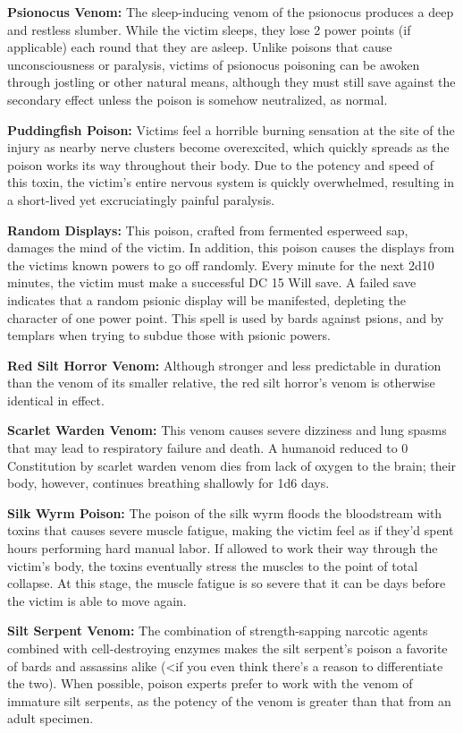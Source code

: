 \textbf{Psionocus Venom:} The sleep-inducing venom of the psionocus produces a deep and restless slumber. While the victim sleeps, they lose 2 power points (if applicable) each round that they are asleep. Unlike poisons that cause unconsciousness or paralysis, victims of psionocus poisoning can be awoken through jostling or other natural means, although they must still save against the secondary effect unless the poison is somehow neutralized, as normal.

\textbf{Puddingfish Poison:} Victims feel a horrible burning sensation at the site of the injury as nearby nerve clusters become overexcited, which quickly spreads as the poison works its way throughout their body. Due to the potency and speed of this toxin, the victim's entire nervous system is quickly overwhelmed, resulting in a short-lived yet excruciatingly painful paralysis.

\textbf{Random Displays:} This poison, crafted from fermented esperweed sap, damages the mind of the victim. In addition, this poison causes the displays from the victims known powers to go off randomly. Every minute for the next 2d10 minutes, the victim must make a successful DC 15 Will save. A failed save indicates that a random psionic display will be manifested, depleting the character of one power point. This spell is used by bards against psions, and by templars when trying to subdue those with psionic powers.

\textbf{Red Silt Horror Venom:} Although stronger and less predictable in duration than the venom of its smaller relative, the red silt horror's venom is otherwise identical in effect.

\textbf{Scarlet Warden Venom:} This venom causes severe dizziness and lung spasms that may lead to respiratory failure and death. A humanoid reduced to 0 Constitution by scarlet warden venom dies from lack of oxygen to the brain; their body, however, continues breathing shallowly for 1d6 days.

\textbf{Silk Wyrm Poison:} The poison of the silk wyrm floods the bloodstream with toxins that causes severe muscle fatigue, making the victim feel as if they'd spent hours performing hard manual labor. If allowed to work their way through the victim's body, the toxins eventually stress the muscles to the point of total collapse. At this stage, the muscle fatigue is so severe that it can be days before the victim is able to move again.

\textbf{Silt Serpent Venom:} The combination of strength-sapping narcotic agents combined with cell-destroying enzymes makes the silt serpent's poison a favorite of bards and assassins alike (<if you even think there's a reason to differentiate the two). When possible, poison experts prefer to work with the venom of immature silt serpents, as the potency of the venom is greater than that from an adult specimen.

